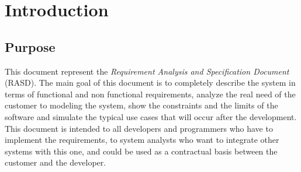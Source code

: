 \chapter{Introduction} \label{chap1}

\section{Purpose}
This document represent the \textit{Requirement Analysis and Specification Document} (RASD). The main goal of this document is to completely describe the system in terms of functional and non functional requirements, analyze the real need of the customer to modeling the system, show the constraints and the limits of the software and simulate the typical use cases that will occur after the development. This document is intended to all developers and programmers who have to implement the requirements, to system analysts who want to integrate other systems with this one, and could be used as a contractual basis between the customer and the developer.

